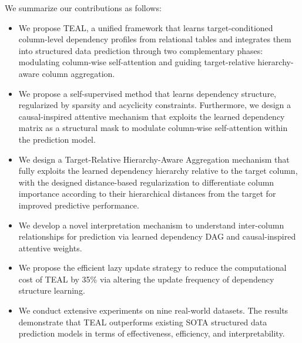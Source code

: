 \documentclass[conference]{IEEEtran}
\newcommand{\sy}[1]{{\color{black}#1}}
\newcommand{\syadd}[1]{{\color{black}#1}}
\newcommand{\vldb}[1]{{\color{black}#1}}
\newcommand{\zjic}[1]{{\color{black}#1}}
\newcommand{\syic}[1]{{\color{black}#1}}
\newcommand{\syone}[1]{{\color{black}#1}}
\newcommand*{\ourmodel}{TEAL}
\begin{document}
We summarize our contributions as follows:

\begin{itemize}
    \item \syic{
    We propose \ourmodel{}, a unified framework that learns target-conditioned column-level dependency profiles from relational tables and \zjic{integrates them into structured data prediction} through two complementary phases: \zjic{
    modulating \syic{column-wise self-attention and guiding target-relative hierarchy-aware column} aggregation.}
    }
    \item \syic{We propose \syic{a self-supervised method} 
    that learns dependency structure, regularized by sparsity and acyclicity constraints. Furthermore, we design a \syone{causal-inspired attentive} mechanism that \syic{exploits} the learned dependency matrix as a structural mask to modulate column-wise self-attention within the prediction model.}

    \item \syic{
    We design a Target-Relative Hierarchy-Aware Aggregation mechanism that fully exploits the learned dependency hierarchy relative to the target column, with the designed distance-based regularization to differentiate column importance according to their hierarchical distances from the target for improved predictive performance.
    }


    \item \vldb{We develop a novel interpretation mechanism to understand inter-column relationships for prediction via learned \syic{dependency} DAG and \syone{causal-inspired attentive} weights.}
    
    \item We propose the efficient lazy update strategy to reduce the computational \sy{cost of \ourmodel{} \syadd{by 35\%} via altering the update frequency of \syic{dependency structure learning}.}
    
    \item We conduct extensive experiments on \syic{nine} real-world datasets. The results demonstrate that \ourmodel{} outperforms existing SOTA structured data prediction models in terms of \sy{effectiveness, efficiency, and interpretability}.
\end{itemize}
\end{document}

